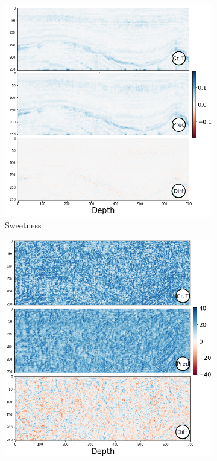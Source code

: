 \documentclass[conference]{IEEEtran}
\begin{document}
\begin{figure}[!t]
     \begin{subfigure}[b]{\figattwidth\textwidth}
         \centering
        \includegraphics[width=1.02\columnwidth]{Fig/newFigs/sweetness-half.png}
        \caption{Sweetness}
        \label{fig:sweetness}
     \end{subfigure}
     \begin{subfigure}[b]{\figattwidth\textwidth}
         \centering
        \includegraphics[width=1.0\columnwidth]{Fig/newFigs/lbp3d-half.png}

\end{subfigure}
\end{figure}
\end{document}
